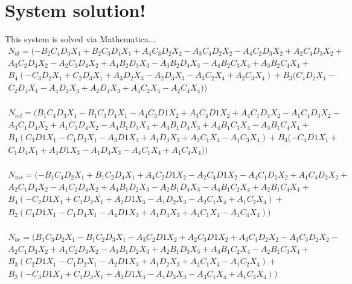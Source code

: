\documentclass[11pt, landscape]{article}
\begin{document}
\section{System solution!}
This system is solved via Mathematica...\\
\begin{multline}
N_{bl} =
(-B_2 C_4 D_3 X_1 + B_2 C_3 D_4 X_1 + A_4 C_3 D_2 X_2 - A_3 C_4 D_2 X_2 - A_4 C_2 D_3 X_2 + A_2 C_4 D_3 X_2 +\\
 A_3 C_2 D_4 X_2 - A_2 C_3 D_4 X_2 + A_4 B_2 D_3 X_3 - A_3 B_2 D_4 X_3 - A_4 B_2 C_3 X_4 + A_3 B_2 C_4 X_4 +\\
B_4 (-C_3 D_2 X_1 + C_2 D_3 X_1 + A_3 D_2 X_3 - A_2 D_3 X_3 - A_3 C_2 X_4 + A_2 C_3 X_4) + B_3 (C_4 D_2 X_1 - \\
C_2 D_4 X_1 - A_4 D_2 X_3 + A_2 D_4 X_3 + A_4 C_2 X_4 - A_2 C_4 X_4)) \\
\end{multline}

\begin{multline}
N_{ml} =
(B_1 C_4 D_3 X_1 - B_1 C_3 D_4 X_1 - A_4 C_3 D1 X_2 + A_3 C_4 D1 X_2 + A_4 C_1 D_3 X_2 - A_1 C_4 D_3 X_2 - \\
A_3 C_1 D_4 X_2 + A_1 C_3 D_4 X_2 - A_4 B_1 D_3 X_3 + A_3 B_1 D_4 X_3 + A_4 B_1 C_3 X_4 - A_3 B_1 C_4 X_4 +\\
B_4 (C_3 D1 X_1 - C_1 D_3 X_1 - A_3 D1 X_3 + A_1 D_3 X_3 + A_3 C_1 X_4 - A_1 C_3 X_4) + B_3 (-C_4 D1 X_1 + \\
C_1 D_4 X_1 + A_4 D1 X_3 - A_1 D_4 X_3 - A_4 C_1 X_4 + A_1 C_4 X_4)) \\
\end{multline}

\begin{multline}
N_{mr} =
(-B_1 C_4 D_2 X_1 + B_1 C_2 D_4 X_1 + A_4 C_2 D1 X_2 - A_2 C_4 D1 X_2 - A_4 C_1 D_2 X_2 + A_1 C_4 D_2 X_2 + \\
A_2 C_1 D_4 X_2 - A_1 C_2 D_4 X_2 + A_4 B_1 D_2 X_3 - A_2 B_1 D_4 X_3 - A_4 B_1 C_2 X_4 + A_2 B_1 C_4 X_4 +\\
B_4 (-C_2 D1 X_1 + C_1 D_2 X_1 + A_2 D1 X_3 - A_1 D_2 X_3 - A_2 C_1 X_4 + A_1 C_2 X_4) + \\
B_2 (C_4 D1 X_1 - C_1 D_4 X_1 - A_4 D1 X_3 + A_1 D_4 X_3 + A_4 C_1 X_4 - A_1 C_4 X_4)) \\
\end{multline}

\begin{multline}
N_{br} =
(B_1 C_3 D_2 X_1 - B_1 C_2 D_3 X_1 - A_3 C_2 D1 X_2 + A_2 C_3 D1 X_2 + A_3 C_1 D_2 X_2 - A_1 C_3 D_2 X_2 - \\
A_2 C_1 D_3 X_2 + A_1 C_2 D_3 X_2 - A_3 B_1 D_2 X_3 + A_2 B_1 D_3 X_3 + A_3 B_1 C_2 X_4 - A_2 B_1 C_3 X_4 +\\
B_3 (C_2 D1 X_1 - C_1 D_2 X_1 - A_2 D1 X_3 + A_1 D_2 X_3 + A_2 C_1 X_4 - A_1 C_2 X_4) + \\
B_2 (-C_3 D1 X_1 + C_1 D_3 X_1 + A_3 D1 X_3 - A_1 D_3 X_3 - A_3 C_1 X_4 + A_1 C_3 X_4)) \\
\end{multline}
\end{document}
